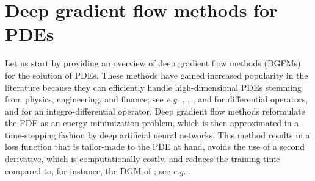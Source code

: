 \documentclass[11pt,a4paper,reqno]{amsart}
\numberwithin{equation}{section}
\theoremstyle{plain}
\theoremstyle{definition}
\begin{document}

\section{Deep gradient flow methods for PDEs}
\label{sec:DGFMs}

Let us start by providing an overview of deep gradient flow methods (DGFMs) for the solution of PDEs. 
These methods have gained increased popularity in the literature because they can efficiently handle high-dimensional PDEs stemming from physics, engineering, and finance; see \textit{e.g.} \citet{E_Yu_2017}, \citet{Liao_Ming_2019}, \citet{georgoulis2023discrete}, \citet{park2023deep} and \citet{papapantoleon2024time} for differential operators, and \citet{georgoulis2024deep} for an integro-differential operator.
Deep gradient flow methods reformulate the PDE as an energy minimization problem, which is then approximated in a time-stepping fashion by deep artificial neural networks. 
This method results in a loss function that is tailor-made to the PDE at hand, avoids the use of a second derivative, which is computationally costly, and reduces the training time compared to, for instance, the DGM of \citet{sirignano2018dgm}; see \textit{e.g.} \citet[Sec.~5]{georgoulis2023discrete}. 
\end{document}
